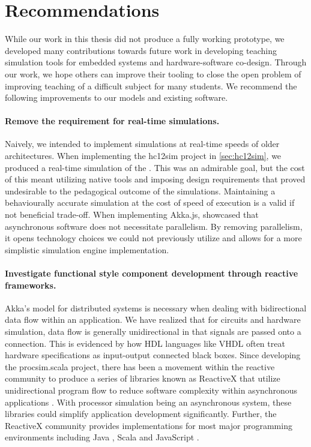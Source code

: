 \section{Recommendations}

While our work in this thesis did not produce a fully working prototype, we developed many contributions towards future work in developing teaching simulation tools for embedded systems and hardware-software co-design. Through our work, we hope others can improve their tooling to close the open problem of improving teaching of a difficult subject for many students. We recommend the following improvements to our models and existing software. 

\paragraph{Remove the requirement for real-time simulations.} Naively, we intended to implement simulations at real-time speeds of older architectures. When implementing the hc12sim project in \cref{sec:hc12sim}, we produced a real-time simulation of the \hcmodel{}. This was an admirable goal, but the cost of this meant utilizing native tools and imposing design requirements that proved undesirable to the pedagogical outcome of the simulations. Maintaining a behaviourally accurate simulation at the cost of speed of execution is a valid if not beneficial trade-off. When implementing Akka.js, \cite{Doeraene2014} showcased that asynchronous software does not necessitate parallelism. By removing parallelism, it opens technology choices we could not previously utilize and allows for a more simplistic simulation engine implementation. 

\paragraph{Investigate functional style component development through reactive frameworks.} Akka's model for distributed systems is necessary when dealing with bidirectional data flow within an application. We have realized that for circuits and hardware simulation, data flow is generally unidirectional in that signals are passed onto a connection. This is evidenced by how HDL languages like VHDL often treat hardware specifications as input-output connected black boxes. Since developing the procsim.scala project, there has been a movement within the reactive community to produce a series of libraries known as ReactiveX that utilize unidirectional program flow to reduce software complexity within asynchronous applications \cite{ReactiveX:HomePage}. With processor simulation being an asynchronous system, these libraries could simplify application development significantly. Further, the ReactiveX community provides implementations for most major programming environments including Java \cite{ReactiveX:Java}, Scala \cite{ReactiveX:Scala} and JavaScript \cite{ReactiveX:JS}. 

